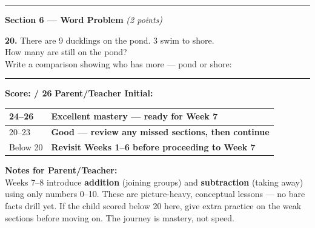 \documentclass[12pt, letterpaper]{article}
\newcommand{\answerline}{\underline{\hspace{2.5cm}}}
\newcommand{\symbox}{\fbox{\hspace{0.7cm}}}
\begin{document}
\bigskip
\noindent\textcolor{scholared}{\rule{\linewidth}{0.4pt}}

\noindent\textcolor{scholared}{\large\textbf{Section 6 — Word Problem}} \hfill \textit{(2 points)}

\bigskip
\noindent\textbf{20.} There are 9 ducklings on the pond. 3 swim to shore.\\[4pt]
How many are still on the pond? \hfill \answerline\\[6pt]
Write a comparison showing who has more — pond or shore: \quad \answerline \; \symbox \; \answerline

\bigskip
\noindent\textcolor{scholared}{\rule{\linewidth}{1pt}}

\begin{scorebox}
\begin{center}
\large\textbf{Score: \answerline / 26} \hspace{2cm}
\textbf{Parent/Teacher Initial: \answerline}\\[8pt]
\renewcommand{\arraystretch}{1.3}
\begin{tabular}{|l|l|}
\hline
24–26 & \textcolor{scholagreen}{\textbf{Excellent mastery — ready for Week 7}} \\
\hline
20–23 & \textcolor{scholablue}{\textbf{Good — review any missed sections, then continue}} \\
\hline
Below 20 & \textcolor{scholared}{\textbf{Revisit Weeks 1–6 before proceeding to Week 7}} \\
\hline
\end{tabular}
\end{center}
\end{scorebox}

\bigskip

\begin{lessonbox}
\textbf{Notes for Parent/Teacher:}\\[4pt]
Weeks 7–8 introduce \textbf{addition} (joining groups) and \textbf{subtraction} (taking away) using only numbers 0–10.
These are picture-heavy, conceptual lessons — no bare facts drill yet.
If the child scored below 20 here, give extra practice on the weak sections before moving on.
The journey is mastery, not speed.
\end{lessonbox}
\end{document}
